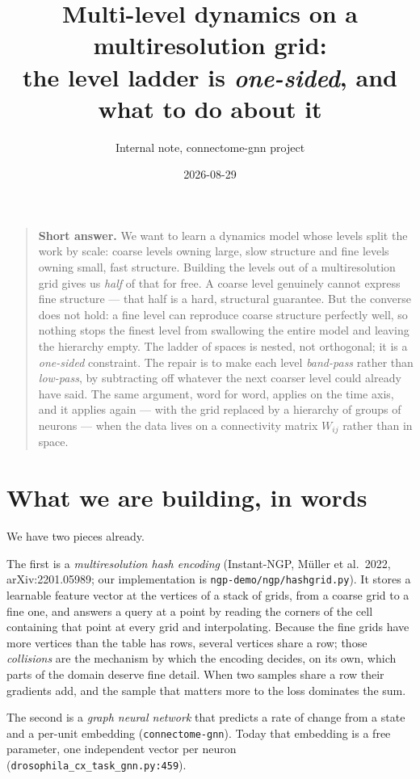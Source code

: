 \documentclass[11pt,a4paper]{article}
\title{Multi-level dynamics on a multiresolution grid:\\
\large the level ladder is \emph{one-sided}, and what to do about it}
\author{Internal note, connectome-gnn project}
\date{2026-08-29}
\begin{document}
\maketitle

\begin{quote}
\textbf{Short answer.} We want to learn a dynamics model whose levels split the work by
scale: coarse levels owning large, slow structure and fine levels owning small, fast
structure. Building the levels out of a multiresolution grid gives us \emph{half} of that
for free. A coarse level genuinely cannot express fine structure --- that half is a hard,
structural guarantee. But the converse does not hold: a fine level can reproduce coarse
structure perfectly well, so nothing stops the finest level from swallowing the entire
model and leaving the hierarchy empty. The ladder of spaces is nested, not orthogonal;
it is a \emph{one-sided} constraint. The repair is to make each level \emph{band-pass}
rather than \emph{low-pass}, by subtracting off whatever the next coarser level could
already have said. The same argument, word for word, applies on the time axis, and it
applies again --- with the grid replaced by a hierarchy of groups of neurons --- when
the data lives on a connectivity matrix $W_{ij}$ rather than in space.
\end{quote}

\tableofcontents

\section{What we are building, in words}

We have two pieces already.

The first is a \emph{multiresolution hash encoding} (Instant-NGP, M\"uller et al.\ 2022,
arXiv:2201.05989; our implementation is \texttt{ngp-demo/ngp/hashgrid.py}). It stores a
learnable feature vector at the vertices of a stack of grids, from a coarse grid to a fine
one, and answers a query at a point by reading the corners of the cell containing that
point at every grid and interpolating. Because the fine grids have more vertices than the
table has rows, several vertices share a row; those \emph{collisions} are the mechanism by
which the encoding decides, on its own, which parts of the domain deserve fine detail. When
two samples share a row their gradients add, and the sample that matters more to the loss
dominates the sum.

The second is a \emph{graph neural network} that predicts a rate of change from a state and
a per-unit embedding (\texttt{connectome-gnn}). Today that embedding is a free parameter,
one independent vector per neuron (\texttt{drosophila\_cx\_task\_gnn.py:459}).
\end{document}
